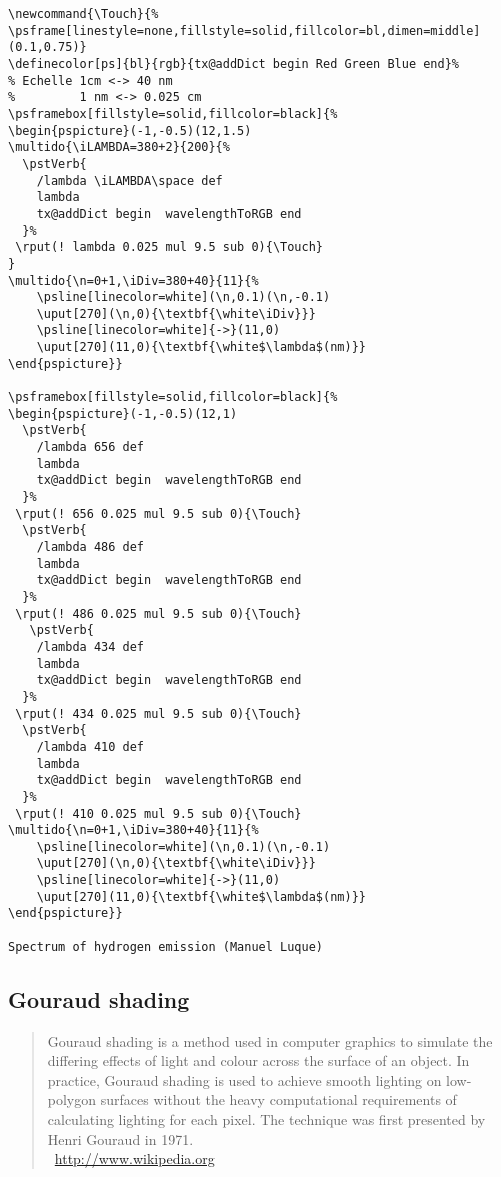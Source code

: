 \begin{lstlisting}
\newcommand{\Touch}{%
\psframe[linestyle=none,fillstyle=solid,fillcolor=bl,dimen=middle](0.1,0.75)}
\definecolor[ps]{bl}{rgb}{tx@addDict begin Red Green Blue end}%
% Echelle 1cm <-> 40 nm
%         1 nm <-> 0.025 cm
\psframebox[fillstyle=solid,fillcolor=black]{%
\begin{pspicture}(-1,-0.5)(12,1.5)
\multido{\iLAMBDA=380+2}{200}{%
  \pstVerb{
    /lambda \iLAMBDA\space def
    lambda
    tx@addDict begin  wavelengthToRGB end
  }%
 \rput(! lambda 0.025 mul 9.5 sub 0){\Touch}
}
\multido{\n=0+1,\iDiv=380+40}{11}{%
    \psline[linecolor=white](\n,0.1)(\n,-0.1)
    \uput[270](\n,0){\textbf{\white\iDiv}}}
    \psline[linecolor=white]{->}(11,0)
    \uput[270](11,0){\textbf{\white$\lambda$(nm)}}
\end{pspicture}}

\psframebox[fillstyle=solid,fillcolor=black]{%
\begin{pspicture}(-1,-0.5)(12,1)
  \pstVerb{
    /lambda 656 def
    lambda
    tx@addDict begin  wavelengthToRGB end
  }%
 \rput(! 656 0.025 mul 9.5 sub 0){\Touch}
  \pstVerb{
    /lambda 486 def
    lambda
    tx@addDict begin  wavelengthToRGB end
  }%
 \rput(! 486 0.025 mul 9.5 sub 0){\Touch}
   \pstVerb{
    /lambda 434 def
    lambda
    tx@addDict begin  wavelengthToRGB end
  }%
 \rput(! 434 0.025 mul 9.5 sub 0){\Touch}
  \pstVerb{
    /lambda 410 def
    lambda
    tx@addDict begin  wavelengthToRGB end
  }%
 \rput(! 410 0.025 mul 9.5 sub 0){\Touch}
\multido{\n=0+1,\iDiv=380+40}{11}{%
    \psline[linecolor=white](\n,0.1)(\n,-0.1)
    \uput[270](\n,0){\textbf{\white\iDiv}}}
    \psline[linecolor=white]{->}(11,0)
    \uput[270](11,0){\textbf{\white$\lambda$(nm)}}
\end{pspicture}}

Spectrum of hydrogen emission (Manuel Luque)
\end{lstlisting}



\subsection{Gouraud shading}
\begin{quotation}
Gouraud shading is a method used in computer graphics to simulate the differing effects of 
light and colour across the surface of an object. In practice, Gouraud shading is used to 
achieve smooth lighting on low-polygon surfaces without the heavy computational requirements 
of calculating lighting for each pixel. The technique was first presented by Henri Gouraud in 1971.\\
~\hfill{\small \url{http://www.wikipedia.org}}
\end{quotation}

